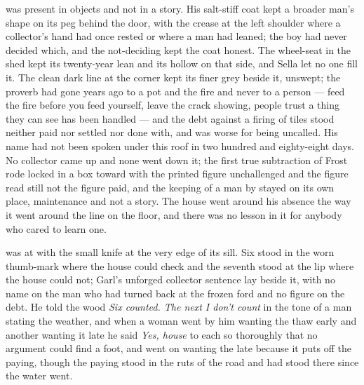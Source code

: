\scenebreak

 was present in objects and not in a story. His salt-stiff coat kept a broader man's shape on its peg behind the door, with the crease at the left shoulder where a collector's hand had once rested or where a man had leaned; the boy had never decided which, and the not-deciding kept the coat honest. The wheel-seat in the shed kept its twenty-year lean and its hollow on that side, and Sella let no one fill it. The clean dark line at the corner kept its finer grey beside it, unswept; the proverb had gone years ago to a pot and the fire and never to a person --- feed the fire before you feed yourself, leave the crack showing, people trust a thing they can see has been handled --- and the debt against a firing of tiles stood neither paid nor settled nor done with, and was worse for being uncalled. His name had not been spoken under this roof in two hundred and eighty-eight days. No collector came up  and none went down it; the first true subtraction of Frost rode locked in a box toward  with the printed figure unchallenged and the figure read still not the figure paid, and the keeping of a man by  stayed on its own place, maintenance and not a story. The house went around his absence the way it went around the line on the floor, and there was no lesson in it for anybody who cared to learn one.

\scenebreak

 was at  with the small knife at the very edge of its sill. Six stood in the worn thumb-mark where the house could check and the seventh stood at the lip where the house could not; Garl's unforged collector sentence lay beside it, with no name on the man who had turned back at the frozen ford and no figure on the debt. He told the wood \emph{Six counted. The next I don't count} in the tone of a man stating the weather, and when a woman went by him wanting the thaw early and another wanting it late he said \emph{Yes, house} to each so thoroughly that no argument could find a foot, and went on wanting the late because it puts off the paying, though the paying stood in the ruts of the road and had stood there since the water went.

